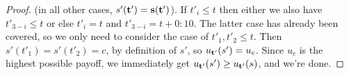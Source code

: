 \documentclass[twocolumn,a4paper,superscriptaddress,nofootinbib]{revtex4}
\begin{document}
\begin{proof}
(in all other cases, $s'(\bf t') = s(\bf t')$). 
If $t'_i \leq t$ then either we also have $t'_{3-i} \leq t$ or else $t'_i = t$ and $t'_{3-i} = t+ 0{:}10$. The latter case has already been covered, so we only need to consider the case of $t'_1,t'_2 \leq t$. Then $s'(t'_1) = s'(t'_2) = c$, by definition of $s'$, so $u_{\bf t'}(s') = u_c$. Since $u_c$ is the highest possible payoff, we immediately get $u_{\bf t'}(s') \geq u_{\bf t'} (s)$, and we're done.
\end{proof}
\end{document}
